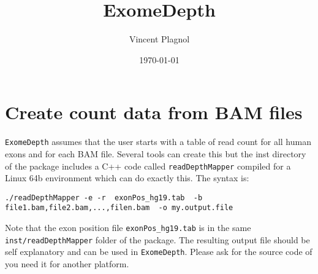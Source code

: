 \documentclass[10pt]{article}
\title{ExomeDepth}
\author{Vincent Plagnol}
\date{\today}
\begin{document}
\maketitle

\tableofcontents


\section{Create count data from BAM files}
\texttt{ExomeDepth} assumes that the user starts with a table of read count for all human exons and for each BAM file.
Several tools can create this but the inst directory of the package includes a C++ code called \texttt{readDepthMapper} compiled for a Linux 64b environment which can do exactly this. The syntax is:\\

\begin{verbatim}
./readDepthMapper -e -r  exonPos_hg19.tab  -b file1.bam,file2.bam,...,filen.bam  -o my.output.file
\end{verbatim}

Note that the exon position file \texttt{exonPos\_hg19.tab} is in the same \texttt{inst/readDepthMapper} folder of the package.
The resulting output file should be self explanatory and can be used in \texttt{ExomeDepth}.
Please ask for the source code of you need it for another platform.
\end{document}

